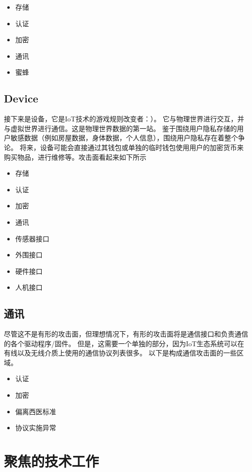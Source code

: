 \documentclass[onecolumn,oneside]{BUPTHomework}
\begin{document}
  \begin{itemize}
    \item 存储
    \item 认证
    \item 加密
    \item 通讯
    \item 蜜蜂
  \end{itemize}

  \subsection{Device}

  接下来是设备，它是IoT技术的游戏规则改变者：）。
  它与物理世界进行交互，并与虚拟世界进行通信。这是物理世界数据的第一站。
  鉴于围绕用户隐私存储的用户敏感数据（例如房屋数据，身体数据，个人信息），围绕用户隐私存在着整个争论。
  将来，设备可能会直接通过其钱包或单独的临时钱包使用用户的加密货币来购买物品，进行维修等。攻击面看起来如下所示

  \begin{itemize}
    \item 存储
    \item 认证
    \item 加密
    \item 通讯
    \item 传感器接口
    \item 外围接口
    \item 硬件接口
    \item 人机接口
  \end{itemize}

  \subsection{通讯}

  尽管这不是有形的攻击面，但理想情况下，有形的攻击面将是通信接口和负责通信的各个驱动程序/固件。
  但是，这需要一个单独的部分，因为IoT生态系统可以在有线以及无线介质上使用的通信协议列表很多。
  以下是构成通信攻击面的一些区域。

  \begin{itemize}
    \item 认证
    \item 加密
    \item 偏离西医标准
    \item 协议实施异常
  \end{itemize}


  \section{聚焦的技术工作}
\end{document}
